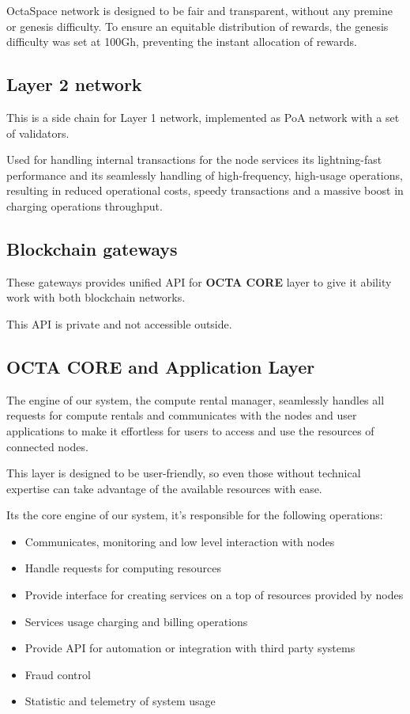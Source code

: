 OctaSpace network is designed to be fair and transparent, without any premine or genesis difficulty. To ensure an equitable distribution of rewards, the genesis difficulty was set at 100Gh, preventing the instant allocation of rewards.

\subsection{Layer 2 network}

This is a side chain for Layer 1 network, implemented as PoA\cite{poa} network with a set of validators.

Used for handling internal transactions for the node services its lightning-fast performance and its seamlessly handling of high-frequency, high-usage operations,
resulting in reduced operational costs, speedy transactions and a massive boost in charging operations throughput.

\subsection{Blockchain gateways}

These gateways provides unified API for \textbf{OCTA CORE} layer to give it ability work with both blockchain networks.

This API is private and not accessible outside.

\subsection{OCTA CORE and Application Layer}
The engine of our system, the compute rental manager, seamlessly handles all requests for compute rentals and communicates with the nodes and user applications to make it effortless for users to access and use the resources of connected nodes.

This layer is designed to be user-friendly, so even those without technical expertise can take advantage of the available resources with ease.

Its the core engine of our system, it's responsible for the following operations:

\begin{itemize}
    \item Communicates, monitoring and low level interaction with nodes
    \item Handle requests for computing resources
    \item Provide interface for creating services on a top of resources provided by nodes
    \item Services usage charging and billing operations
    \item Provide API for automation or integration with third party systems
    \item Fraud control
    \item Statistic and telemetry of system usage
\end{itemize}

